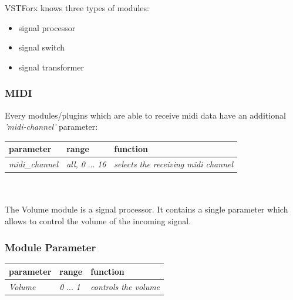 \newcommand{\aktion}[1]{ \subsubsection{#1} }
\newcommand{\bParameterlist}{\begin{tabular}[t]{l|p{3.3cm}|l} parameter & range & function \\ \hline }
\newcommand{\param}[4]{\emph{#1} & \emph{#2} ... \emph{#3} & \emph{#4} \\}
\newcommand{\paramSw}[4]{\emph{#1} & \emph{#2} / \emph{#3} & \emph{#4} \\}
\newcommand{\paramRe}[6]{\emph{#1} & \emph{#2}...\emph{#3} or \emph{#4}...\emph{#5} & \emph{#6} \\}
\newcommand{\eParameterlist}{\end{tabular}\\\\}


VSTForx knows three types of modules: 
\begin{itemize}
	\item signal processor
	\item signal switch
	\item signal transformer
\end{itemize}
\aktion{MIDI}
Every modules/plugins which are able to receive midi data have an additional \emph{'midi-channel'} parameter:\\
\bParameterlist
	\param{midi\_channel}{all, 0}{16}{selects the receiving midi channel }
\eParameterlist


The Volume module is a signal processor. It contains a single parameter which allows to control the volume of the incoming signal.
\aktion{Module Parameter}
	\bParameterlist
		\param{Volume}{0}{1}{controls the volume}
	\eParameterlist

